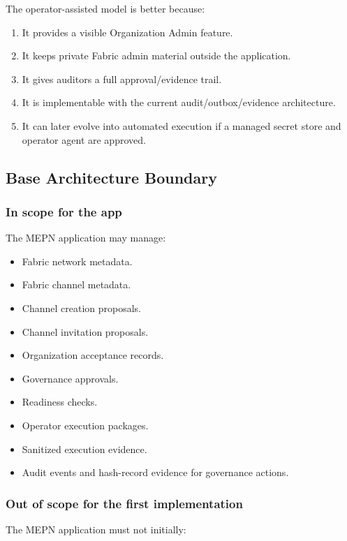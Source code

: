 The operator-assisted model is better because:

\begin{enumerate}
  \item It provides a visible Organization Admin feature.
  \item It keeps private Fabric admin material outside the application.
  \item It gives auditors a full approval/evidence trail.
  \item It is implementable with the current audit/outbox/evidence architecture.
  \item It can later evolve into automated execution if a managed secret store and operator agent are approved.
\end{enumerate}

\subsection{Base Architecture Boundary}

\subsubsection{In scope for the app}

The MEPN application may manage:

\begin{itemize}
  \item Fabric network metadata.
  \item Fabric channel metadata.
  \item Channel creation proposals.
  \item Channel invitation proposals.
  \item Organization acceptance records.
  \item Governance approvals.
  \item Readiness checks.
  \item Operator execution packages.
  \item Sanitized execution evidence.
  \item Audit events and hash-record evidence for governance actions.
\end{itemize}

\subsubsection{Out of scope for the first implementation}

The MEPN application must not initially:

